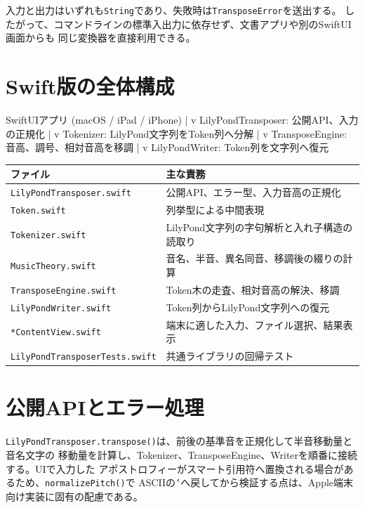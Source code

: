 \documentclass[uplatex,a4paper,11pt]{jsbook}
\begin{document}
入力と出力はいずれも\texttt{String}であり、失敗時は\texttt{TransposeError}を送出する。
したがって、コマンドラインの標準入出力に依存せず、文書アプリや別のSwiftUI画面からも
同じ変換器を直接利用できる。

\chapter{Swift版の全体構成}

\begin{command}
SwiftUIアプリ (macOS / iPad / iPhone)
        |
        v
LilyPondTransposer: 公開API、入力の正規化
        |
        v
Tokenizer: LilyPond文字列をToken列へ分解
        |
        v
TransposeEngine: 音高、調号、相対音高を移調
        |
        v
LilyPondWriter: Token列を文字列へ復元
\end{command}

\begin{longtable}{@{}p{45mm}p{96mm}@{}}
\toprule
ファイル & 主な責務\\
\midrule
\texttt{LilyPondTransposer.swift} & 公開API、エラー型、入力音高の正規化\\
\texttt{Token.swift} & 列挙型による中間表現\\
\texttt{Tokenizer.swift} & LilyPond文字列の字句解析と入れ子構造の読取り\\
\texttt{MusicTheory.swift} & 音名、半音、異名同音、移調後の綴りの計算\\
\texttt{TransposeEngine.swift} & Token木の走査、相対音高の解決、移調\\
\texttt{LilyPondWriter.swift} & Token列からLilyPond文字列への復元\\
\texttt{*ContentView.swift} & 端末に適した入力、ファイル選択、結果表示\\
\texttt{LilyPondTransposer}\newline\texttt{Tests.swift} & 共通ライブラリの回帰テスト\\
\bottomrule
\end{longtable}



\chapter{公開APIとエラー処理}

\texttt{LilyPondTransposer.transpose()}は、前後の基準音を正規化して半音移動量と音名文字の
移動量を計算し、Tokenizer、TransposeEngine、Writerを順番に接続する。UIで入力した
アポストロフィーがスマート引用符へ置換される場合があるため、\texttt{normalizePitch()}で
ASCIIの\texttt{'}へ戻してから検証する点は、Apple端末向け実装に固有の配慮である。
\end{document}
